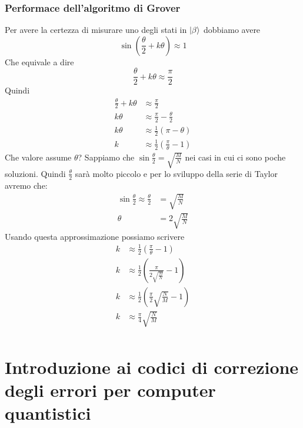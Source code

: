 \documentclass[12pt, a4paper]{report}
\begin{document}
\subsection{Performace dell'algoritmo di Grover}
Per avere la certezza di misurare uno degli stati in $| \beta \rangle$ dobbiamo avere
\begin{equation*}
    \sin\left(\frac{\theta}{2}+k\theta\right) \approx 1
\end{equation*}
Che equivale a dire
\begin{equation*}
    \frac{\theta}{2}+k\theta \approx \frac{\pi}{2}
\end{equation*}
Quindi
\begin{equation*}
    \begin{split}
        \frac{\theta}{2}+k\theta &\approx \frac{\pi}{2} \\
        k\theta &\approx \frac{\pi}{2}-\frac{\theta}{2} \\
        k\theta &\approx \frac{1}{2}(\pi-\theta) \\
        k &\approx \frac{1}{2}\left(\frac{\pi}{\theta}-1\right)
    \end{split}
\end{equation*}
Che valore assume $\theta$? Sappiamo che $\sin\frac{\theta}{2}=\sqrt{\frac{M}{N}}$ nei casi in cui ci sono poche soluzioni. Quindi $\frac{\theta}{2}$ sarà molto piccolo e per lo sviluppo della serie di Taylor avremo che:
\begin{equation*}
    \begin{split}
        \sin\frac{\theta}{2}\approx\frac{\theta}{2}&=\sqrt{\frac{M}{N}}\\
        \theta &= 2\sqrt{\frac{M}{N}}
    \end{split}
\end{equation*}
Usando questa approssimazione possiamo scrivere
\begin{equation*}
    \begin{split}
        k &\approx \frac{1}{2}\left(\frac{\pi}{\theta}-1\right) \\
        k &\approx \frac{1}{2}\left(\frac{\pi}{2\sqrt{\frac{M}{N}}}-1\right) \\
        k &\approx \frac{1}{2}\left(\frac{\pi}{2}\sqrt{\frac{N}{M}}-1\right) \\
        k &\approx \frac{\pi}{4}\sqrt{\frac{N}{M}} \\
    \end{split}
\end{equation*}
\chapter{Introduzione ai codici di correzione degli errori per computer quantistici}
\end{document}
